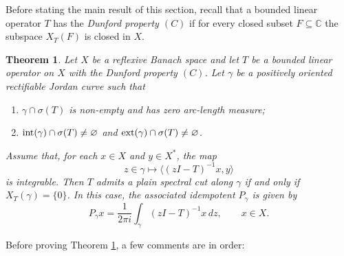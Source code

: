 \documentclass[11pt]{amsart}
\newtheorem{theorem}{Theorem}[section]
\theoremstyle{definition}
\theoremstyle{remark}
\numberwithin{equation}{section}
\newcommand{\inte}{\textnormal{int}}
\newcommand{\exte}{\textnormal{ext}}
\begin{document}
\medskip

Before stating the main result of this section, recall that a bounded linear operator $T$ has the \emph{Dunford property $(C)$} if for every closed subset $F\subseteq \mathbb{C}$ the subspace $X_T(F)$ is closed in $X$.


\medskip

\begin{theorem}\label{teorema punto expuesto}
Let $X$ be a reflexive Banach space and let $T$ be a bounded linear operator on $X$ with the Dunford property $(C)$. Let $\gamma$ be a positively oriented rectifiable Jordan curve such that
\begin{enumerate}
    \item[(i)] $\gamma\cap \sigma(T)$ is non-empty and has zero arc-length measure;
    \item[(ii)] $\inte(\gamma)\cap\sigma(T)\neq\varnothing$ and $\exte(\gamma)\cap\sigma(T)\neq\varnothing$.
\end{enumerate}
Assume that, for each $x\in X$ and $y\in X^*$, the map
\begin{equation}\label{condicion integral}
z\in \gamma \longmapsto \langle (z I-T)^{-1}x,y\rangle
\end{equation}
is integrable. Then $T$ admits a plain spectral cut along $\gamma$ if and only if $X_T(\gamma)=\{0\}$. In this case, the associated idempotent $P_\gamma$ is given by
$$
P_\gamma x=\frac{1}{2\pi i}\int_\gamma (z I-T)^{-1}x\,dz,
\qquad x\in X.
$$
\end{theorem}

\smallskip

\noindent Before proving Theorem \ref{teorema punto expuesto}, a few comments are in order:
\end{document}

